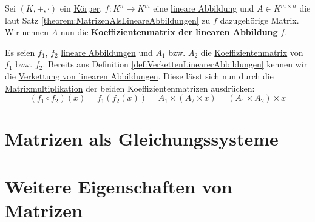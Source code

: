 \documentclass[../../main.tex]{subfiles}
\begin{document}
	\begin{definition}
		\label{def:KoeffizientenmatrixEinerLinearenAbbildung}
		Sei $(K,+,\cdot)$ ein \hyperref[def:Körper]{Körper}, $f: K^n \rightarrow K^m$ eine \hyperref[def:LineareAbbildung]{lineare Abbildung} und $A \in K^{m \times n}$ die laut Satz \ref{theorem:MatrizenAlsLineareAbbildungen} zu $f$ dazugehörige Matrix. Wir nennen $A$ nun die \textbf{Koeffizientenmatrix der linearen Abbildung} $f$. 
	\end{definition}

	\begin{theorem}
		Es seien $f_1$, $f_2$ \hyperref[def:LineareAbbildung]{lineare Abbildungen} und $A_1$ bzw. $A_2$ die \hyperref[def:KoeffizientenmatrixEinerLinearenAbbildung]{Koeffizientenmatrix} von $f_1$ bzw. $f_2$. Bereits aus Definition \ref{def:VerkettenLinearerAbbildungen} kennen wir die \hyperref[def:VerkettenLinearerAbbildungen]{Verkettung von linearen Abbildungen}. Diese lässt sich nun durch die \hyperref[def:Matrixmultiplikation]{Matrixmultiplikation} der beiden Koeffizientenmatrizen ausdrücken: 
		$$
			(f_1 \circ f_2)(x) = f_1(f_2(x)) = A_1 \times (A_2 \times x) = (A_1 \times A_2) \times x
		$$
	\end{theorem}
	
	
	
	\section{Matrizen als Gleichungssysteme}
	
	
	
	
	\section{Weitere Eigenschaften von Matrizen}
	
\end{document}
